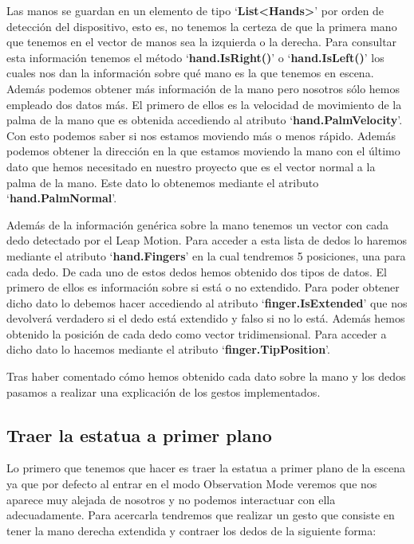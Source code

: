 \documentclass[a4paper,11pt]{article}
\begin{document}
\vspace{10px}

Las manos se guardan en un elemento de tipo `\textbf{List<Hands>}' por orden de detección del dispositivo, esto es, no tenemos la certeza de que la primera mano que tenemos en el vector de manos sea la izquierda o la derecha. Para consultar esta información tenemos el método `\textbf{hand.IsRight()}' o `\textbf{hand.IsLeft()}' los cuales nos dan la información sobre qué mano es la que tenemos en escena. Además podemos obtener más información de la mano pero nosotros sólo hemos empleado dos datos más. El primero de ellos es la velocidad de movimiento de la palma de la mano que es obtenida accediendo al atributo `\textbf{hand.PalmVelocity}'. Con esto podemos saber si nos estamos moviendo más o menos rápido. Además podemos obtener la dirección en la que estamos moviendo la mano con el último dato que hemos necesitado en nuestro proyecto que es el vector normal a la palma de la mano. Este dato lo obtenemos mediante el atributo `\textbf{hand.PalmNormal}'.

\vspace{10px}

Además de la información genérica sobre la mano tenemos un vector con cada dedo detectado por el Leap Motion. Para acceder a esta lista de dedos lo haremos mediante el atributo `\textbf{hand.Fingers}' en la cual tendremos 5 posiciones, una para cada dedo. De cada uno de estos dedos hemos obtenido dos tipos de datos. El primero de ellos es información sobre si está o no extendido. Para poder obtener dicho dato lo debemos hacer accediendo al atributo `\textbf{finger.IsExtended}' que nos devolverá verdadero si el dedo está extendido y falso si no lo está. Además hemos obtenido la posición de cada dedo como vector tridimensional. Para acceder a dicho dato lo hacemos mediante el atributo `\textbf{finger.TipPosition}'.

\vspace{10px}

Tras haber comentado cómo hemos obtenido cada dato sobre la mano y los dedos pasamos a realizar una explicación de los gestos implementados.

\subsection{Traer la estatua a primer plano}

Lo primero que tenemos que hacer es traer la estatua a primer plano de la escena ya que por defecto al entrar en el modo Observation Mode veremos que nos aparece muy alejada de nosotros y no podemos interactuar con ella adecuadamente. Para acercarla tendremos que realizar un gesto que consiste en tener la mano derecha extendida y contraer los dedos de la siguiente forma:
\end{document}
